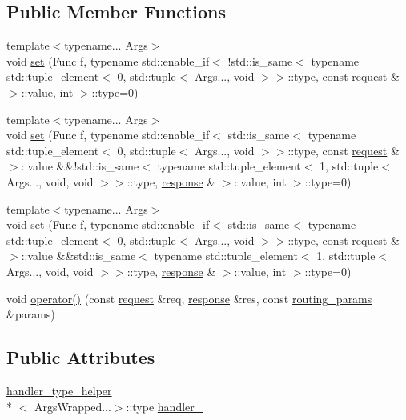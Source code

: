 \subsection*{Public Member Functions}
\begin{DoxyCompactItemize}
\item 
{\footnotesize template$<$typename... Args$>$ }\\void \hyperlink{structcrow_1_1detail_1_1routing__handler__call__helper_1_1_wrapped_aef9d7883adbfe7f36103b76f82f5ad2a}{set} (Func f, typename std\-::enable\-\_\-if$<$ !std\-::is\-\_\-same$<$ typename std\-::tuple\-\_\-element$<$ 0, std\-::tuple$<$ Args..., void $>$$>$\-::type, const \hyperlink{structcrow_1_1request}{request} \& $>$\-::value, int $>$\-::type=0)
\item 
{\footnotesize template$<$typename... Args$>$ }\\void \hyperlink{structcrow_1_1detail_1_1routing__handler__call__helper_1_1_wrapped_a00f457665a21a279b28073501c28f32a}{set} (Func f, typename std\-::enable\-\_\-if$<$ std\-::is\-\_\-same$<$ typename std\-::tuple\-\_\-element$<$ 0, std\-::tuple$<$ Args..., void $>$$>$\-::type, const \hyperlink{structcrow_1_1request}{request} \& $>$\-::value \&\&!std\-::is\-\_\-same$<$ typename std\-::tuple\-\_\-element$<$ 1, std\-::tuple$<$ Args..., void, void $>$$>$\-::type, \hyperlink{structcrow_1_1response}{response} \& $>$\-::value, int $>$\-::type=0)
\item 
{\footnotesize template$<$typename... Args$>$ }\\void \hyperlink{structcrow_1_1detail_1_1routing__handler__call__helper_1_1_wrapped_aacef65832d8cc913f382bd2501f2f790}{set} (Func f, typename std\-::enable\-\_\-if$<$ std\-::is\-\_\-same$<$ typename std\-::tuple\-\_\-element$<$ 0, std\-::tuple$<$ Args..., void $>$$>$\-::type, const \hyperlink{structcrow_1_1request}{request} \& $>$\-::value \&\&std\-::is\-\_\-same$<$ typename std\-::tuple\-\_\-element$<$ 1, std\-::tuple$<$ Args..., void, void $>$$>$\-::type, \hyperlink{structcrow_1_1response}{response} \& $>$\-::value, int $>$\-::type=0)
\item 
void \hyperlink{structcrow_1_1detail_1_1routing__handler__call__helper_1_1_wrapped_ae037f7cd31dcec958eaf9918dfdaf55d}{operator()} (const \hyperlink{structcrow_1_1request}{request} \&req, \hyperlink{structcrow_1_1response}{response} \&res, const \hyperlink{structcrow_1_1routing__params}{routing\-\_\-params} \&params)
\end{DoxyCompactItemize}
\subsection*{Public Attributes}
\begin{DoxyCompactItemize}
\item 
\hyperlink{structcrow_1_1detail_1_1routing__handler__call__helper_1_1_wrapped_1_1handler__type__helper}{handler\-\_\-type\-\_\-helper}\\*
$<$ Args\-Wrapped...$>$\-::type \hyperlink{structcrow_1_1detail_1_1routing__handler__call__helper_1_1_wrapped_ab8030d2b00c5a3f90c269423e1d26efe}{handler\-\_\-}
\end{DoxyCompactItemize}


